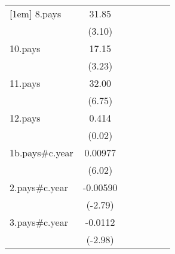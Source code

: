 {\begin{tabular}{l*{6}{c}}
[1em]
8.pays              &       31.85\sym{**} &                     &                     &                     &                     &                     \\
                    &      (3.10)         &                     &                     &                     &                     &                     \\
[1em]
10.pays             &       17.15\sym{**} &                     &                     &                     &                     &                     \\
                    &      (3.23)         &                     &                     &                     &                     &                     \\
[1em]
11.pays             &       32.00\sym{***}&                     &                     &                     &                     &                     \\
                    &      (6.75)         &                     &                     &                     &                     &                     \\
[1em]
12.pays             &       0.414         &                     &                     &                     &                     &                     \\
                    &      (0.02)         &                     &                     &                     &                     &                     \\
[1em]
1b.pays#c.year      &     0.00977\sym{***}&                     &                     &                     &                     &                     \\
                    &      (6.02)         &                     &                     &                     &                     &                     \\
[1em]
2.pays#c.year       &    -0.00590\sym{**} &                     &                     &                     &                     &                     \\
                    &     (-2.79)         &                     &                     &                     &                     &                     \\
[1em]
3.pays#c.year       &     -0.0112\sym{**} &                     &                     &                     &                     &                     \\
                    &     (-2.98)         &                     &                     &                     &                     &                     \\

\end{tabular}}
